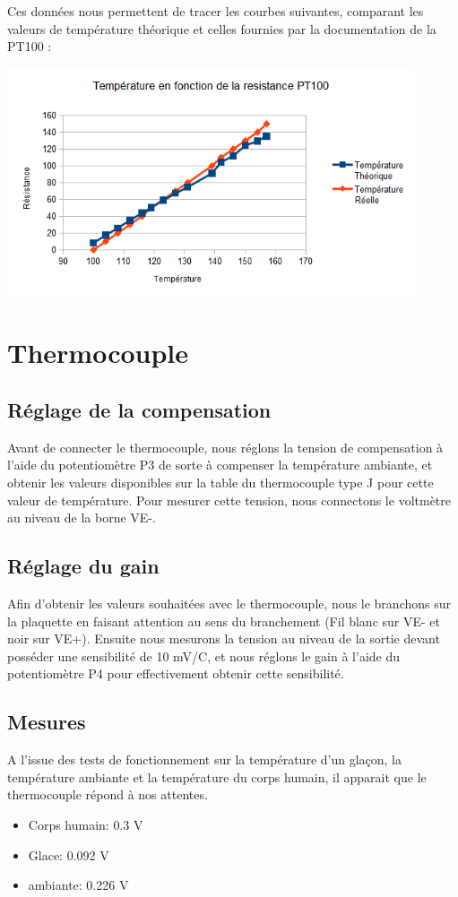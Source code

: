 \documentclass[a4paper,12pt]{article}
\begin{document}
      \par Ces données nous permettent de tracer les courbes suivantes, comparant les valeurs de température théorique et celles fournies par la documentation de la PT100 :
			\begin{center}
				\includegraphics[width=12cm]{../Images/GraphPT100.png}
			\end{center}
    \newpage

  \section{Thermocouple}
		\subsection{Réglage de la compensation}
			\par Avant de connecter le thermocouple, nous réglons la tension de compensation à l'aide du potentiomètre P3 de sorte à compenser la température ambiante,
			et obtenir les valeurs disponibles sur la table du thermocouple type J pour cette valeur de température.
			Pour mesurer cette tension, nous connectons le voltmètre au niveau de la borne VE-.

		\subsection{Réglage du gain}
			\par Afin d'obtenir les valeurs souhaitées avec le thermocouple, nous le branchons sur la plaquette en faisant attention au sens du branchement (Fil blanc sur VE- et noir sur VE+).
			Ensuite nous mesurons la tension au niveau de la sortie devant posséder une sensibilité de 10 mV/{\degre}C, et nous réglons le gain à l'aide du potentiomètre P4 pour effectivement obtenir cette sensibilité.

		\subsection{Mesures}
			\par A l'issue des tests de fonctionnement sur la température d'un glaçon, la température ambiante et la température du corps humain, il apparait que le thermocouple répond à nos attentes.
      		\begin{itemize}
				\item Corps humain: 0.3 V
				\item Glace: 0.092 V
				\item ambiante: 0.226 V
			\end{itemize}
\end{document}
